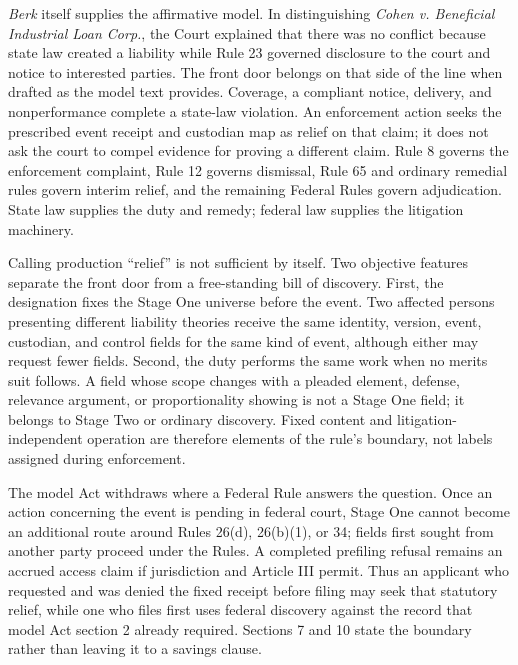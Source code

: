 \emph{Berk} itself supplies the affirmative model. In distinguishing \emph{Cohen v. Beneficial Industrial Loan Corp.}, the Court explained that there was no conflict because state law created a liability while Rule 23 governed disclosure to the court and notice to interested parties. The front door belongs on that side of the line when drafted as the model text provides. Coverage, a compliant notice, delivery, and nonperformance complete a state-law violation. An enforcement action seeks the prescribed event receipt and custodian map as relief on that claim; it does not ask the court to compel evidence for proving a different claim. Rule 8 governs the enforcement complaint, Rule 12 governs dismissal, Rule 65 and ordinary remedial rules govern interim relief, and the remaining Federal Rules govern adjudication. State law supplies the duty and remedy; federal law supplies the litigation machinery.

Calling production ``relief'' is not sufficient by itself. Two objective features separate the front door from a free-standing bill of discovery. First, the designation fixes the Stage One universe before the event. Two affected persons presenting different liability theories receive the same identity, version, event, custodian, and control fields for the same kind of event, although either may request fewer fields. Second, the duty performs the same work when no merits suit follows. A field whose scope changes with a pleaded element, defense, relevance argument, or proportionality showing is not a Stage One field; it belongs to Stage Two or ordinary discovery. Fixed content and litigation-independent operation are therefore elements of the rule's boundary, not labels assigned during enforcement.

The model Act withdraws where a Federal Rule answers the question. Once an action concerning the event is pending in federal court, Stage One cannot become an additional route around Rules 26(d), 26(b)(1), or 34; fields first sought from another party proceed under the Rules. A completed prefiling refusal remains an accrued access claim if jurisdiction and Article III permit. Thus an applicant who requested and was denied the fixed receipt before filing may seek that statutory relief, while one who files first uses federal discovery against the record that model Act section 2 already required. Sections 7 and 10 state the boundary rather than leaving it to a savings clause.

